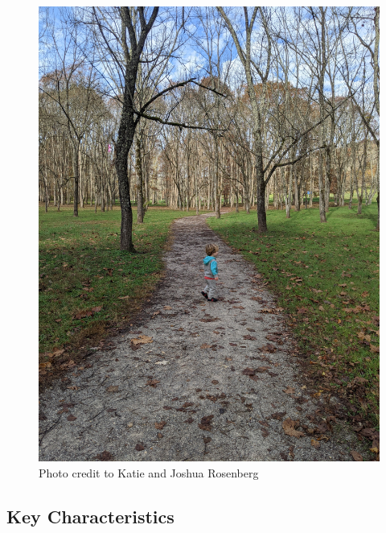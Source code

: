 \documentclass[
  letterpaper,
  DIV=11,
  numbers=noendperiod]{scrreprt}
\begin{document}
\begin{figure}[H]

{\centering \includegraphics[width=6.25in,height=\textheight,keepaspectratio]{img/trail-11-figure-01.jpg}

}

\caption{Photo credit to Katie and Joshua Rosenberg}

\end{figure}%

\subsection{Key Characteristics}\label{key-characteristics-11}
\end{document}
